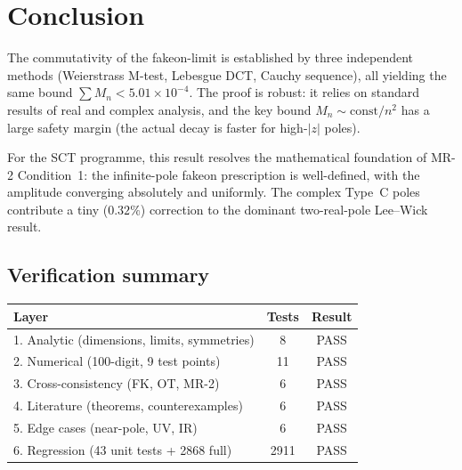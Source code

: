 \documentclass[11pt,a4paper]{article}
\begin{document}
\section{Conclusion}
\label{sec:conclusion}

The commutativity of the fakeon-limit is established by three independent
methods (Weierstrass M-test, Lebesgue DCT, Cauchy sequence), all yielding
the same bound $\sum M_n < 5.01 \times 10^{-4}$.  The proof is robust:
it relies on standard results of real and complex analysis, and the key
bound $M_n \sim \text{const}/n^2$ has a large safety margin (the actual
decay is faster for high-$|z|$ poles).

For the SCT programme, this result resolves the mathematical foundation
of MR-2 Condition~1: the infinite-pole fakeon prescription is
well-defined, with the amplitude converging absolutely and uniformly.
The complex Type~C poles contribute a tiny ($0.32\%$) correction to the
dominant two-real-pole Lee--Wick result.

\subsection*{Verification summary}

\begin{center}
\begin{tabular}{lcc}
\toprule
Layer & Tests & Result \\
\midrule
1. Analytic (dimensions, limits, symmetries) & 8 & PASS \\
2. Numerical (100-digit, 9 test points) & 11 & PASS \\
3. Cross-consistency (FK, OT, MR-2) & 6 & PASS \\
4. Literature (theorems, counterexamples) & 6 & PASS \\
5. Edge cases (near-pole, UV, IR) & 6 & PASS \\
6. Regression (43 unit tests + 2868 full) & 2911 & PASS \\
\bottomrule
\end{tabular}
\end{center}
\end{document}

